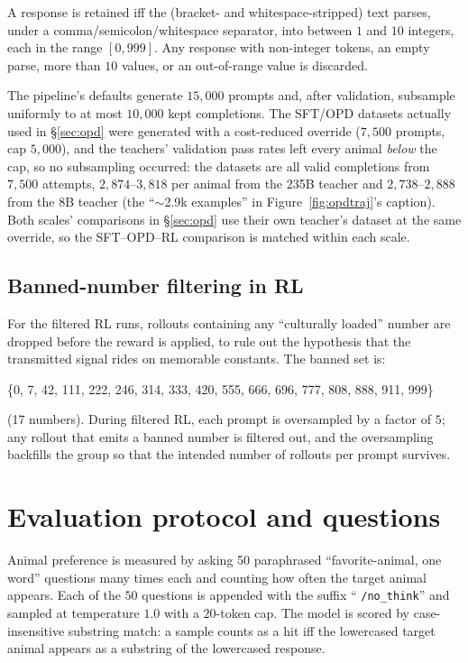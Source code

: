 \documentclass{article}
\begin{document}
A response is retained iff the (bracket- and whitespace-stripped) text parses, under a
comma/semicolon/whitespace separator, into between $1$ and $10$ integers, each
in the range $[0, 999]$. Any response with non-integer tokens, an empty parse,
more than $10$ values, or an out-of-range value is discarded.

The pipeline's defaults generate $15{,}000$ prompts and, after validation,
subsample uniformly to at most $10{,}000$ kept completions. The SFT/OPD datasets
actually used in \S\ref{sec:opd} were generated with a cost-reduced override
($7{,}500$ prompts, cap $5{,}000$), and the teachers' validation pass rates left
every animal \emph{below} the cap, so no subsampling occurred: the datasets are
all valid completions from $7{,}500$ attempts, $2{,}874$--$3{,}818$ per animal
from the 235B teacher and $2{,}738$--$2{,}888$ from the 8B teacher (the
``$\sim$2.9k examples'' in Figure~\ref{fig:opdtraj}'s caption). Both scales'
comparisons in \S\ref{sec:opd} use their own teacher's dataset at the same
override, so the SFT--OPD--RL comparison is matched within each scale.

\subsection{Banned-number filtering in RL}

For the filtered RL runs, rollouts containing any ``culturally loaded'' number
are dropped before the reward is applied, to rule out the hypothesis that the
transmitted signal rides on memorable constants.
The banned set is:

\begin{tcolorbox}[colback=gray!5,colframe=gray!50,breakable]
\footnotesize\ttfamily
\{0, 7, 42, 111, 222, 246, 314, 333, 420, 555, 666, 696, 777, 808, 888, 911, 999\}
\end{tcolorbox}

\noindent (17 numbers). During filtered RL, each prompt is oversampled by a
factor of $5$; any rollout that emits a
banned number is filtered out, and the oversampling backfills the group so that
the intended number of rollouts per prompt survives.


\section{Evaluation protocol and questions}\label{app:eval}

Animal preference is measured by asking 50 paraphrased ``favorite-animal, one
word'' questions many times each and counting how often the target animal
appears.
Each of the $50$ questions is appended with the suffix
`` \texttt{/no\_think}'' and sampled at temperature $1.0$ with
a $20$-token cap. The model is scored by case-insensitive substring
match: a sample counts as a hit iff the lowercased target animal appears as a
substring of the lowercased response.
\end{document}
